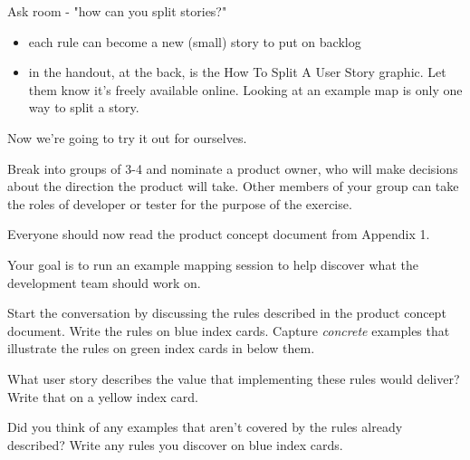     Ask room - "how can you split stories?"
    
    \begin{itemize}
        \item each rule can become a new (small) story to put on backlog 
        \item in the handout, at the back, is the How To Split A User Story graphic. Let them know it's freely available online. Looking at an example map is only one way to split a story.
    \end{itemize}

    
\fi 


\ifcontent

    Now we're going to try it out for ourselves.
    
    Break into groups of 3-4 and nominate a product owner, who will make decisions about the direction the product will take. Other members of your group can take the roles of developer or tester for the purpose of the exercise.
    
    Everyone should now read the product concept document from Appendix 1.
    
    Your goal is to run an example mapping session to help discover what the development team should work on. 
    
    Start the conversation by discussing the rules described in the product concept document. Write the rules on blue index cards. Capture \emph{concrete} examples that illustrate the rules on green index cards in below them.
    
    What user story describes the value that implementing these rules would deliver? Write that on a yellow index card.
    
    Did you think of any examples that aren't covered by the rules already described? Write any rules you discover on blue index cards. 
    
\fi